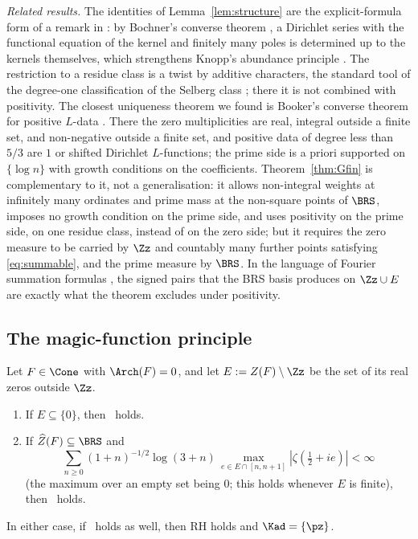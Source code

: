 \emph{Related results.} The identities of Lemma~\ref{lem:structure} are the explicit-formula form of a remark in \cite[\S4.1]{BRS}:
by Bochner's converse theorem \cite{Boc51}, a Dirichlet series with the functional equation of the kernel and finitely many poles is
determined up to the kernels themselves, which strengthens Knopp's abundance principle \cite{Kno00}. The restriction to a residue
class is a twist by additive characters, the standard tool of the degree-one classification of the Selberg class
\cite{CG93,KP99,Sou05}; there it is not combined with positivity. The closest uniqueness theorem we found is
Booker's converse theorem for positive $L$-data \cite[Definition~1.3, Theorem~1.7]{Boo15}. There the zero multiplicities are real,
integral outside a finite set, and non-negative outside a finite set, and positive data of degree less than $5/3$ are $1$ or shifted
Dirichlet $L$-functions; the prime side is a priori supported on $\{\log n\}$ with growth conditions on the coefficients. Theorem~\ref{thm:Gfin}
is complementary to it, not a generalisation: it allows non-integral weights at infinitely many ordinates and prime mass at the non-square
points of $\BRS$, imposes no growth condition on the prime side, and uses positivity on the prime side, on one residue class, instead of on the zero side; but
it requires the zero measure to be carried by $\Zz$ and countably many further points satisfying \eqref{eq:summable}, and the prime measure
by $\BRS$. In the language of Fourier summation formulas \cite{Gon23}, the signed
pairs that the BRS basis produces on $\Zz\cup E$ are exactly what the theorem excludes under positivity.


\subsection{The magic-function principle}

\begin{corollary}\label{cor:magic}
Let $F\in\Cone$ with $\Arch(F)=0$, and let $E:=Z(F)\setminus\Zz$ be the set of its real zeros outside $\Zz$.
\begin{enumerate}[label=\textup{(\alph*)}]
\item If $E\subseteq\{0\}$, then \condU\ holds.
\item If $\widehat Z(F)\subseteq\BRS$ and
\begin{equation}\label{eq:summableF}
\sum_{n\ge0}(1+n)^{-1/2}\log(3+n)\,\max_{e\in E\cap[n,n+1]}|\zeta(\tfrac12+ie)|<\infty
\end{equation}
(the maximum over an empty set being $0$; this holds whenever $E$ is finite), then \condU\ holds.
\end{enumerate}
In either case, if \condE\ holds as well, then RH holds and $\Kad=\{\pz\}$.
\end{corollary}

